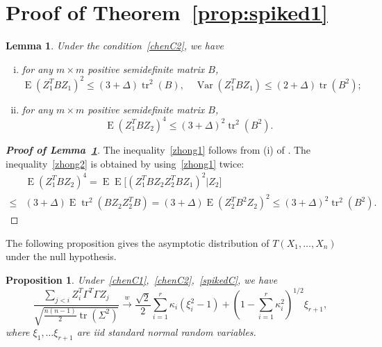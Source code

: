 \documentclass[3p]{elsarticle}
\DeclareMathOperator{\mytr}{tr}
\DeclareMathOperator{\myE}{E}
\DeclareMathOperator{\myVar}{Var}
\theoremstyle{plain}
\newtheorem{proposition}{\quad\quad Proposition}
\newtheorem{lemma}{Lemma}
\theoremstyle{definition}
\theoremstyle{remark}
\begin{document}
\section{Proof of Theorem~\ref{prop:spiked1}}
\begin{lemma}\label{lemma:zhong1}
    Under the condition~\eqref{chenC2}, we have
    \begin{enumerate}[(i)]
        \item
            for any $m\times m$ positive semidefinite matrix $B$,
            \begin{equation*}\label{zhong1}
            \myE(Z_1^T B Z_1)^2\leq (3+\Delta) \mytr^2(B),\quad
            \myVar(Z_1^T B Z_1)\leq (2+\Delta) \mytr(B^2);
            \end{equation*}
        \item
            for any $m\times m$ positive semidefinite matrix $B$,
            \begin{equation*}\label{zhong2}
                \myE (Z_1^T B Z_2)^4\leq (3+\Delta)^2\mytr^2 (B^2).
            \end{equation*}
    \end{enumerate}
\end{lemma}
\begin{proof}[\textbf{Proof of Lemma~\ref{lemma:zhong1}}]
    The inequality~\eqref{zhong1} follows from (i) of \citet[Proposition A.1]{songxi2010}.
    The inequality~\eqref{zhong2} is obtained by using~\eqref{zhong1} twice:
    $$
    \begin{aligned} 
        &\myE (Z_1^T B Z_2)^4
                =\myE\myE\big[ (Z_1^T B Z_2 Z_2^T B Z_1)^2|Z_2\big]
                \\
                \leq &
                (3+\Delta)\myE  \mytr^2 (B Z_2 Z_2^T B)
                =
                (3+\Delta)\myE  (Z_2^T B^2 Z_2 )^2
                \leq (3+\Delta)^2\mytr^2 (B^2).
    \end{aligned}
    $$

\end{proof}
The following proposition gives the asymptotic distribution of $T(X_1,\ldots,X_n)$ under the null hypothesis.
\begin{proposition}\label{prop:spiked2}
    Under~\eqref{chenC1},~\eqref{chenC2},~\eqref{spikedC},
    we have
    $$
    \frac{\sum_{j<i} Z_i^T \Gamma^T \Gamma Z_j }
    {\sqrt{\frac{n(n-1)}{2}\mytr(\Sigma^2)}}
    \xrightarrow{w}\frac{\sqrt{2}}{2}\sum_{i=1}^r \kappa_i (\xi_i^2-1)+(1-\sum_{i=1}^r \kappa_i^2)^{1/2} \xi_{r+1},
    $$
    where $\xi_1,\ldots \xi_{r+1}$ are iid standard normal random variables.
\end{proposition}
\end{document}
